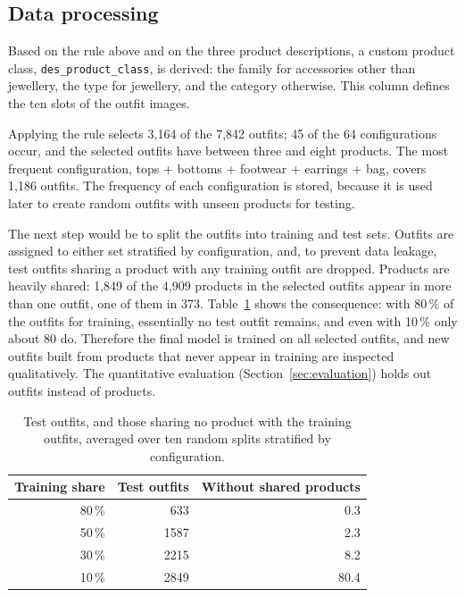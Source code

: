 \documentclass[10pt,a4paper,twocolumn]{article}
\newcommand{\code}[1]{\texttt{\small #1}}
\begin{document}
\subsection{Data processing}

Based on the rule above and on the three product descriptions, a custom product class, \code{des\_product\_class}, is derived: the family for accessories other than jewellery, the type for jewellery, and the category otherwise. This column defines the ten slots of the outfit images.

Applying the rule selects 3,164 of the 7,842 outfits; 45 of the 64 configurations occur, and the selected outfits have between three and eight products. The most frequent configuration, tops + bottoms + footwear + earrings + bag, covers 1,186 outfits. The frequency of each configuration is stored, because it is used later to create random outfits with unseen products for testing.

The next step would be to split the outfits into training and test sets. Outfits are assigned to either set stratified by configuration, and, to prevent data leakage, test outfits sharing a product with any training outfit are dropped. Products are heavily shared: 1,849 of the 4,909 products in the selected outfits appear in more than one outfit, one of them in 373. Table~\ref{tab:split} shows the consequence: with 80\,\% of the outfits for training, essentially no test outfit remains, and even with 10\,\% only about 80 do. Therefore the final model is trained on all selected outfits, and new outfits built from products that never appear in training are inspected qualitatively. The quantitative evaluation (Section~\ref{sec:evaluation}) holds out outfits instead of products.

\begin{table}[tb]
\centering\small
\begin{tabular}{rrr}
\toprule
Training share & Test outfits & Without shared products \\
\midrule
80\,\% & 633 & 0.3 \\
50\,\% & 1587 & 2.3 \\
30\,\% & 2215 & 8.2 \\
10\,\% & 2849 & 80.4 \\
\bottomrule
\end{tabular}
\caption{Test outfits, and those sharing no product with the training outfits, averaged over ten random splits stratified by configuration.}
\label{tab:split}
\end{table}
\end{document}
